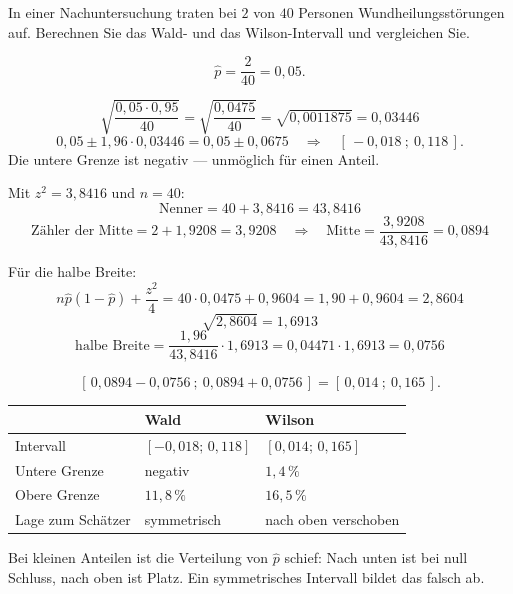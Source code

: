 \begin{aufgabe}
In einer Nachuntersuchung traten bei $2$ von $40$ Personen Wundheilungsstörungen auf. Berechnen Sie das Wald- und das Wilson-Intervall und vergleichen Sie.

\loesung
{}
\[ \hat p = \frac{2}{40} = 0{,}05 . \]

\[ \sqrt{\frac{0{,}05 \cdot 0{,}95}{40}} = \sqrt{\frac{0{,}0475}{40}} = \sqrt{0{,}0011875} = 0{,}03446 \]
\[ 0{,}05 \pm 1{,}96 \cdot 0{,}03446 = 0{,}05 \pm 0{,}0675 \quad\Longrightarrow\quad [\,-0{,}018\ ;\ 0{,}118\,] . \]
Die untere Grenze ist negativ --- unmöglich für einen Anteil.

Mit $z^2 = 3{,}8416$ und $n = 40$:
\[ \text{Nenner} = 40 + 3{,}8416 = 43{,}8416 \]
\[ \text{Zähler der Mitte} = 2 + 1{,}9208 = 3{,}9208 \quad\Longrightarrow\quad \text{Mitte} = \frac{3{,}9208}{43{,}8416} = 0{,}0894 \]

Für die halbe Breite:
\[ n\hat p(1-\hat p) + \frac{z^2}{4} = 40 \cdot 0{,}0475 + 0{,}9604 = 1{,}90 + 0{,}9604 = 2{,}8604 \]
\[ \sqrt{2{,}8604} = 1{,}6913 \]
\[ \text{halbe Breite} = \frac{1{,}96}{43{,}8416} \cdot 1{,}6913 = 0{,}04471 \cdot 1{,}6913 = 0{,}0756 \]

\[ [\,0{,}0894 - 0{,}0756\ ;\ 0{,}0894 + 0{,}0756\,] = [\,0{,}014\ ;\ 0{,}165\,] . \]

\begin{center}
\renewcommand{\arraystretch}{1.48}
\begin{tabular}{@{}P{2.2cm}P{2.8cm}P{2.8cm}@{}}
\toprule
& \textbf{Wald} & \textbf{Wilson}\\
\midrule
Intervall & $[-0{,}018;\,0{,}118]$ & $[0{,}014;\,0{,}165]$\\
Untere Grenze & \textcolor{akzent}{negativ} & \textcolor{gruen}{$1{,}4\,\%$}\\
Obere Grenze & $11{,}8\,\%$ & $16{,}5\,\%$\\
Lage zum Schätzer & symmetrisch & \textcolor{gruen}{nach oben verschoben}\\
\bottomrule
\end{tabular}
\end{center}

Bei kleinen Anteilen ist die Verteilung von $\hat p$ schief: Nach unten ist bei null Schluss, nach oben ist Platz. Ein symmetrisches Intervall bildet das falsch ab.


\end{aufgabe}
